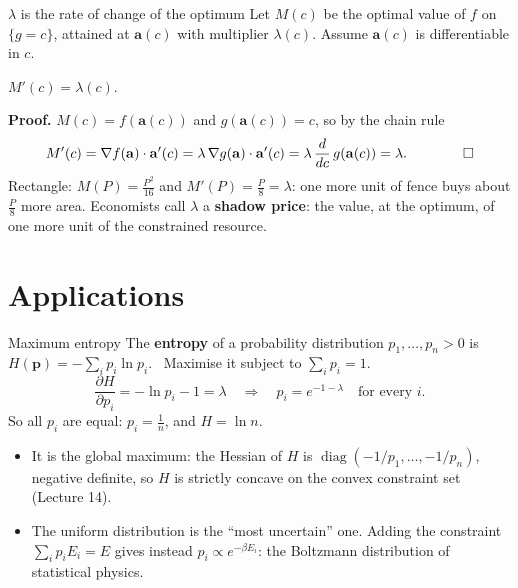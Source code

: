 \documentclass[10pt]{wosm-slides}
\newcommand{\va}{\mathbf{a}}
\newcommand{\vp}{\mathbf{p}}
\begin{document}
\begin{frame}{$\lambda$ is the rate of change of the optimum}
  Let $M(c)$ be the optimal value of $f$ on $\{g = c\}$, attained at $\va(c)$ with multiplier
  $\lambda(c)$. Assume $\va(c)$ is differentiable in $c$.
  \pause
  \begin{theorem}
    $M'(c) = \lambda(c)$.
  \end{theorem}
  \pause
  \textbf{Proof.} $M(c) = f(\va(c))$ and $g(\va(c)) = c$, so by the chain rule
  \[ M'(c) = \nabla f(\va) \cdot \va'(c) = \lambda\, \nabla g(\va) \cdot \va'(c)
     = \lambda\, \frac{d}{dc}\, g(\va(c)) = \lambda . \qquad \qed \]
  \pause
  Rectangle: $M(P) = \frac{P^2}{16}$ and $M'(P) = \frac P8 = \lambda$: one more unit of fence buys about
  $\frac P8$ more area. Economists call $\lambda$ a \textbf{shadow price}: the value, at the optimum, of
  one more unit of the constrained resource.
\end{frame}

\section{Applications}

\begin{frame}{Maximum entropy}
  The \textbf{entropy} of a probability distribution $p_1, \dots, p_n > 0$ is
  $H(\vp) = -\sum_i p_i \ln p_i$. \ Maximise it subject to $\sum_i p_i = 1$.
  \pause
  \[ \frac{\partial H}{\partial p_i} = -\ln p_i - 1 = \lambda \quad\Longrightarrow\quad
     p_i = e^{-1 - \lambda} \quad \text{for every } i . \]
  So all $p_i$ are equal: $p_i = \frac1n$, and $H = \ln n$.
  \pause
  \begin{itemize}
    \item It is the global maximum: the Hessian of $H$ is $\operatorname{diag}(-1/p_1, \dots, -1/p_n)$,
      negative definite, so $H$ is strictly concave on the convex constraint set (Lecture 14).
    \item The uniform distribution is the ``most uncertain'' one. Adding the constraint
      $\sum_i p_i E_i = E$ gives instead $p_i \propto e^{-\beta E_i}$: the Boltzmann distribution of
      statistical physics.
  \end{itemize}
\end{frame}
\end{document}
